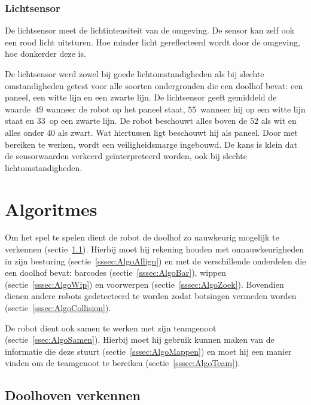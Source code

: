 \documentclass[eind]{penoverslag}
\begin{document}
\subsubsection{Lichtsensor}
De lichtsensor meet de lichtintensiteit van de omgeving. De sensor kan zelf ook een rood licht uitsturen. Hoe minder licht gereflecteerd wordt door de omgeving, hoe donkerder deze is.

De lichtsensor werd zowel bij goede lichtomstandigheden als bij slechte omstandigheden getest voor alle soorten ondergronden die een doolhof bevat: een paneel, een witte lijn en een zwarte lijn.
De lichtsensor geeft gemiddeld de waarde~$49$ wanneer de robot op het paneel staat, $55$~wanneer hij op een witte lijn staat en $33$~op een zwarte lijn. De robot beschouwt alles boven de $52$ als wit en alles onder $40$ als zwart. Wat hiertussen ligt beschouwt hij als paneel. Door met bereiken te werken, wordt een veiligheidsmarge ingebouwd. De kans is klein dat de sensorwaarden verkeerd ge\"interpreteerd worden, ook bij slechte lichtomstandigheden.


\newpage

\section{Algoritmes}
\label{sec:Algo}

Om het spel te spelen dient de robot de doolhof zo nauwkeurig mogelijk te verkennen (sectie~\ref{ssec:AlgoVerken}). Hierbij moet hij rekening houden met onnauwkeurigheden in zijn besturing (sectie~\ref{sssec:AlgoAllign}) en met de verschillende onderdelen die een doolhof bevat: barcodes (sectie~\ref{sssec:AlgoBar}), wippen (sectie~\ref{sssec:AlgoWip}) en voorwerpen (sectie~\ref{sssec:AlgoZoek}). Bovendien dienen andere robots gedetecteerd te worden zodat botsingen vermeden worden (sectie~\ref{sssec:AlgoCollision}).

De robot dient ook samen te werken met zijn teamgenoot (sectie~\ref{ssec:AlgoSamen}). Hierbij moet hij gebruik kunnen maken van de informatie die deze stuurt (sectie~\ref{sssec:AlgoMappen}) en moet hij een manier vinden om de teamgenoot te bereiken (sectie~\ref{sssec:AlgoTeam}).


\subsection{Doolhoven verkennen}
\label{ssec:AlgoVerken}
\end{document}
